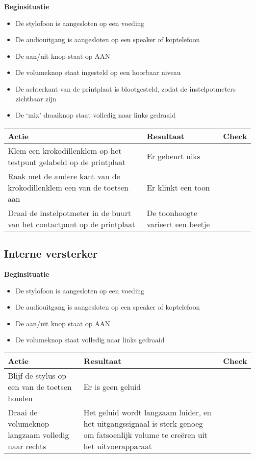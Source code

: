 \documentclass[12pt, a4paper, dutch]{article}
\newcommand{\cb}{\Square}
\newcommand{\stroom}{De stylofoon is aangesloten op een voeding}
\newcommand{\audio}{De audiouitgang is aangesloten op een speaker of koptelefoon}
\newcommand{\aan}{De aan/uit knop staat op AAN}
\newcommand{\vol}{De volumeknop staat ingesteld op een hoorbaar niveau}
\begin{document}
\begin{minipage}{\textwidth}
\textbf{Beginsituatie}
\begin{itemize}
	\item \stroom
	\item \audio
	\item \aan
	\item \vol
	\item De achterkant van de printplaat is blootgesteld, zodat de instelpotmeters
		zichtbaar zijn
	\item De `mix' draaiknop staat volledig naar links gedraaid
\end{itemize}

\medskip

\begin{tabularx}{\textwidth}{p{}p{}>{\raggedleft\arraybackslash}X}
\toprule
\textbf{Actie} & \textbf{Resultaat} & \textbf{Check}\\
\midrule
Klem een krokodillenklem op het testpunt gelabeld op de printplaat &
Er gebeurt niks &
\cb\\

Raak met de andere kant van de krokodillenklem een van de toetsen aan &
Er klinkt een toon &
\cb\\

Draai de instelpotmeter in de buurt van het contactpunt op de printplaat &
De toonhoogte varieert een beetje &
\cb\\
\bottomrule
\end{tabularx}
\end{minipage}

\subsection{Interne versterker}

\begin{minipage}{\textwidth}
\textbf{Beginsituatie}
\begin{itemize}
	\item \stroom
	\item \audio
	\item \aan
	\item De volumeknop staat volledig naar links gedraaid
\end{itemize}

\medskip

\begin{tabularx}{\textwidth}{p{}p{}>{\raggedleft\arraybackslash}X}
\toprule
\textbf{Actie} & \textbf{Resultaat} & \textbf{Check}\\
\midrule
Blijf de stylus op een van de toetsen houden &
Er is geen geluid &
\cb\\

Draai de volumeknop langzaam volledig naar rechts &
Het geluid wordt langzaam luider, en het uitgangssignaal is sterk genoeg om
fatsoenlijk volume te cre\"eren uit het uitvoerapparaat &
\cb\\
\bottomrule
\end{tabularx}
\end{minipage}
\end{document}
